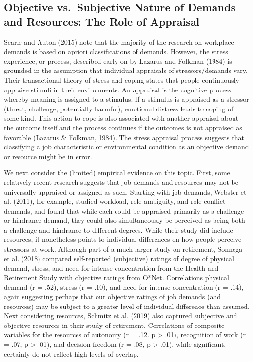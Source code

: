 \documentclass[
  man]{apa6}
\begin{document}
\hypertarget{objective-vs.-subjective-nature-of-demands-and-resources-the-role-of-appraisal}{%
\subsection{Objective vs.~Subjective Nature of Demands and Resources: The Role of Appraisal}\label{objective-vs.-subjective-nature-of-demands-and-resources-the-role-of-appraisal}}

Searle and Auton (2015) note that the majority of the research on workplace demands is based on apriori classifications of demands. However, the stress experience, or process, described early on by Lazarus and Folkman (1984) is grounded in the assumption that individual appraisals of stressors/demands vary. Their transactional theory of stress and coping states that people continuously appraise stimuli in their environments. An appraisal is the cognitive process whereby meaning is assigned to a stimulus. If a stimulus is appraised as a stressor (threat, challenge, potentially harmful), emotional distress leads to coping of some kind. This action to cope is also associated with another appraisal about the outcome itself and the process continues if the outcomes is not appraised as favorable (Lazarus \& Folkman, 1984). The stress appraisal process suggests that classifying a job characteristic or environmental condition as an objective demand or resource might be in error.

We next consider the (limited) empirical evidence on this topic. First, some relatively recent research suggests that job demands and resources may not be universally appraised or assigned as such. Starting with job demands, Webster et al. (2011), for example, studied workload, role ambiguity, and role conflict demands, and found that while each could be appraised primarily as a challenge or hindrance demand, they could also simultaneously be perceived as being both a challenge and hindrance to different degrees. While their study did include resources, it nonetheless points to individual differences on how people perceive stressors at work. Although part of a much larger study on retirement, Sonnega et al. (2018) compared self-reported (subjective) ratings of degree of physical demand, stress, and need for intense concentration from the Health and Retirement Study with objective ratings from O*Net. Correlations physical demand (r = .52), stress (r = .10), and need for intense concentration (r = .14), again suggesting perhaps that our objective ratings of job demands (and resources) may be subject to a greater level of individual difference than assumed. Next considering resources, Schmitz et al. (2019) also captured subjective and objective resources in their study of retirement. Correlations of composite variables for the resources of autonomy (r = .12. p \textgreater{} .01), recognition of work (r = .07, p \textgreater{} .01), and decision freedom (r = .08, p \textgreater{} .01), while significant, certainly do not reflect high levels of overlap.
\end{document}
